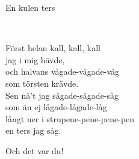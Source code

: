 \begin{song}{En kulen ters}
	
	
	\\
	
	
	Först helan kall, kall, kall\\
	jag i mig hävde,\\
	och halvans vågade-vågade-våg\\
	som törsten krävde.\\
	Sen nå't jag sågade-sågade-såg\\
	som än ej lågade-lågade-låg\\
	långt ner i strupene-pene-pene-pen\\
	en ters jag såg.
	
	Och det var du!
	
\end{song}
